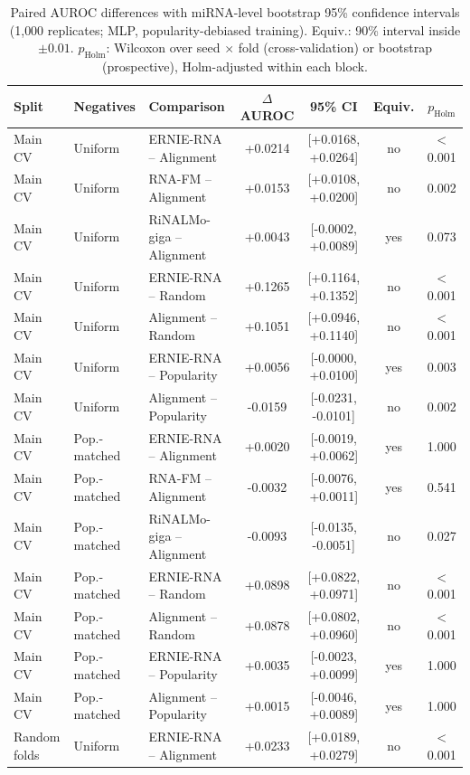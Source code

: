 {\footnotesize\setlength{\tabcolsep}{3pt}
\begin{longtable}{lllcccc}
\caption{Paired AUROC differences with miRNA-level bootstrap 95\% confidence intervals (1{,}000 replicates; MLP, popularity-debiased training). Equiv.: 90\% interval inside $\pm0.01$. $p_\mathrm{Holm}$: Wilcoxon over seed $\times$ fold (cross-validation) or bootstrap (prospective), Holm-adjusted within each block.}\label{tab:s4}\\
\toprule Split & Negatives & Comparison & $\Delta$AUROC & 95\% CI & Equiv. & $p_\mathrm{Holm}$\\\midrule\endhead
Main CV & Uniform & ERNIE-RNA -- Alignment & +0.0214 & [+0.0168, +0.0264] & no & $<$0.001\\
Main CV & Uniform & RNA-FM -- Alignment & +0.0153 & [+0.0108, +0.0200] & no & 0.002\\
Main CV & Uniform & RiNALMo-giga -- Alignment & +0.0043 & [-0.0002, +0.0089] & yes & 0.073\\
Main CV & Uniform & ERNIE-RNA -- Random & +0.1265 & [+0.1164, +0.1352] & no & $<$0.001\\
Main CV & Uniform & Alignment -- Random & +0.1051 & [+0.0946, +0.1140] & no & $<$0.001\\
Main CV & Uniform & ERNIE-RNA -- Popularity & +0.0056 & [-0.0000, +0.0100] & yes & 0.003\\
Main CV & Uniform & Alignment -- Popularity & -0.0159 & [-0.0231, -0.0101] & no & 0.002\\
Main CV & Pop.-matched & ERNIE-RNA -- Alignment & +0.0020 & [-0.0019, +0.0062] & yes & 1.000\\
Main CV & Pop.-matched & RNA-FM -- Alignment & -0.0032 & [-0.0076, +0.0011] & yes & 0.541\\
Main CV & Pop.-matched & RiNALMo-giga -- Alignment & -0.0093 & [-0.0135, -0.0051] & no & 0.027\\
Main CV & Pop.-matched & ERNIE-RNA -- Random & +0.0898 & [+0.0822, +0.0971] & no & $<$0.001\\
Main CV & Pop.-matched & Alignment -- Random & +0.0878 & [+0.0802, +0.0960] & no & $<$0.001\\
Main CV & Pop.-matched & ERNIE-RNA -- Popularity & +0.0035 & [-0.0023, +0.0099] & yes & 1.000\\
Main CV & Pop.-matched & Alignment -- Popularity & +0.0015 & [-0.0046, +0.0089] & yes & 1.000\\
\midrule
Random folds & Uniform & ERNIE-RNA -- Alignment & +0.0233 & [+0.0189, +0.0279] & no & $<$0.001\\

\end{longtable}}
